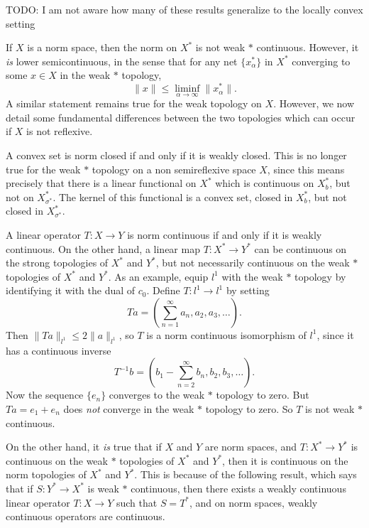 TODO: I am not aware how many of these results generalize to the locally convex setting

If $X$ is a norm space, then the norm on $X^*$ is not weak $*$ continuous. However, it \emph{is} lower semicontinuous, in the sense that for any net $\{ x_\alpha^* \}$ in $X^*$ converging to some $x \in X$ in the weak $*$ topology,
%
\[ \| x \| \leq \liminf_{\alpha \to \infty} \| x_\alpha^* \|. \]
%
A similar statement remains true for the weak topology on $X$. However, we now detail some fundamental differences between the two topologies which can occur if $X$ is not reflexive.

\begin{example}
    A convex set is norm closed if and only if it is weakly closed. This is no longer true for the weak $*$ topology on a non semireflexive space $X$, since this means precisely that there is a linear functional on $X^*$ which is continuous on $X^*_b$, but not on $X^*_{\sigma^*}$. The kernel of this functional is a convex set, closed in $X^*_b$, but not closed in $X^*_{\sigma^*}$.
\end{example}

\begin{example}
    A linear operator $T: X \to Y$ is norm continuous if and only if it is weakly continuous. On the other hand, a linear map $T: X^* \to Y^*$ can be continuous on the strong topologies of $X^*$ and $Y^*$, but not necessarily continuous on the weak $*$ topologies of $X^*$ and $Y^*$. As an example, equip $l^1$ with the weak $*$ topology by identifying it with the dual of $c_0$. Define $T: l^1 \to l^1$ by setting
    \[ Ta = \left( \sum_{n = 1}^\infty a_n, a_2, a_3, \dots \right). \]
    Then $\| Ta \|_{l^1} \leq 2 \| a \|_{l^1}$, so $T$ is a norm continuous isomorphism of $l^1$, since it has a continuous inverse
    \[ T^{-1}b = \left( b_1 - \sum_{n = 2}^\infty b_n, b_2, b_3, \dots \right). \]
    Now the sequence $\{ e_n \}$ converges to the weak $*$ topology to zero. But $Ta = e_1 + e_n$ does \emph{not} converge in the weak $*$ topology to zero. So $T$ is not weak $*$ continuous.
\end{example}

On the other hand, it \emph{is} true that if $X$ and $Y$ are norm spaces, and $T: X^* \to Y^*$ is continuous on the weak $*$ topologies of $X^*$ and $Y^*$, then it is continuous on the norm topologies of $X^*$ and $Y^*$. This is because of the following result, which says that if $S: Y^* \to X^*$ is weak $*$ continuous, then there exists a weakly continuous linear operator $T: X \to Y$ such that $S = T^*$, and on norm spaces, weakly continuous operators are continuous.

